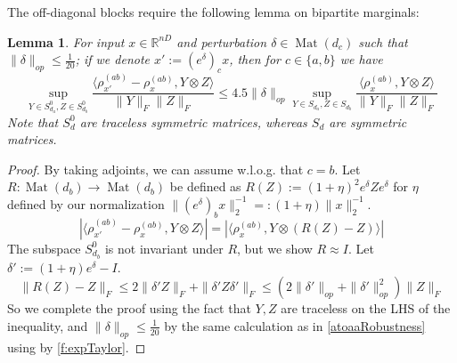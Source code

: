 \documentclass[aos]{imsart}
\newtheorem{lemma}[theorem]{Lemma}
\theoremstyle{definition}
\numberwithin{equation}{section}
\DeclareMathOperator{\Mat}{Mat}
\newcommand{\R}{{\mathbb{R}}}
\newcommand{\smallSym}{S}
\newcommand{\samp}{x}
\begin{document}
\begin{appendix}
The off-diagonal blocks require the following lemma on bipartite marginals:

\begin{lemma} \label{btoabRobustness}
For input $\samp \in \R^{nD}$ and perturbation $\delta \in \Mat(d_{c})$ such that $\|\delta\|_{op} \leq \frac{1}{20}$; if we denote $\samp' := (e^{\delta})_{c} \samp$, then for $c \in \{a,b\}$ we have
\[ \sup_{Y \in \smallSym_{d_{a}}^{0}, Z \in \smallSym_{d_{b}}^{0}} \frac{\langle \rho_{\samp'}^{(ab)} - \rho_{\samp}^{(ab)}, Y \otimes Z \rangle}{\|Y\|_{F} \|Z\|_{F}} \leq 4.5 \|\delta\|_{op} \sup_{Y \in \smallSym_{d_{a}}, Z \in \smallSym_{d_{b}}} \frac{\langle \rho_{\samp}^{(ab)}, Y \otimes Z \rangle}{\|Y\|_{F} \|Z\|_{F}}        \]
Note that $\smallSym_{d}^{0}$ are traceless symmetric matrices, whereas $\smallSym_{d}$ are symmetric matrices.
\end{lemma}
\begin{proof}
By taking adjoints, we can assume w.l.o.g. that $c = b$. Let $R : \Mat(d_{b}) \to \Mat(d_{b})$ be defined as $R(Z) := (1+\eta)^{2} e^{\delta} Z e^{\delta}$ for $\eta$ defined by our normalization $\|(e^{\delta})_{b} \samp\|_{2}^{-1} =: (1+\eta) \|\samp\|_{2}^{-1}$.
\[ |\langle \rho_{\samp'}^{(ab)} - \rho_{\samp}^{(ab)}, Y \otimes Z \rangle| = |\langle \rho_{\samp}^{(ab)}, Y \otimes (R(Z) - Z) \rangle|  \]
The subspace $\smallSym_{d_{b}}^{0}$ is not invariant under $R$, but we show $R \approx I$. Let $\delta' := (1+\eta) e^{\delta} - I$.
\[ \|R(Z) - Z\|_{F} \leq 2 \|\delta' Z\|_{F} + \|\delta' Z \delta'\|_{F} \leq (2 \|\delta'\|_{op} + \|\delta'\|_{op}^{2}) \|Z\|_{F}    \]
So we complete the proof using the fact that $Y,Z$ are traceless on the LHS of the inequality, and $\|\delta\|_{op} \leq \frac{1}{20}$ by the same calculation as in \cref{atoaaRobustness} using by \cref{f:expTaylor}.
\end{proof}


\end{appendix}
\end{document}
